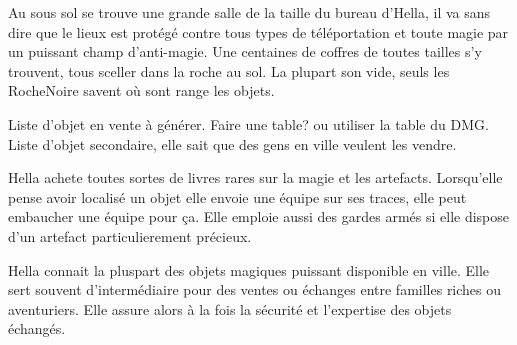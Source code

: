 Au sous sol se trouve une grande salle de la taille du bureau d'Hella, il 
va sans dire que le lieux est protégé contre tous types de téléportation
et toute magie par un puissant champ d'anti-magie. Une centaines de coffres 
de toutes tailles s'y trouvent, tous sceller dans la roche au sol.
La plupart son vide, seuls les RocheNoire savent où sont range les objets. 

Liste d'objet en vente à générer. Faire une table? ou utiliser la table
du DMG. Liste d'objet secondaire, elle sait que des gens en ville veulent 
les vendre.

Hella achete toutes sortes de livres rares sur la magie et les artefacts.
Lorsqu'elle pense avoir localisé un objet elle envoie une équipe sur ses 
traces, elle peut embaucher une équipe pour ça. Elle emploie aussi des
gardes armés si elle dispose d'un artefact particulierement précieux.

Hella connait la pluspart des objets magiques puissant disponible en ville.
Elle sert souvent d'intermédiaire pour des ventes ou échanges entre familles
riches ou aventuriers. Elle assure alors à la fois la sécurité et 
l'expertise des objets échangés. 

